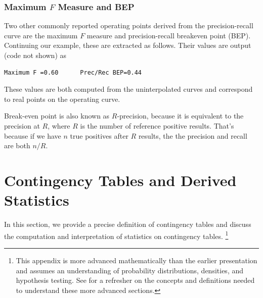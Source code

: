 \subsubsection{Maximum $F$ Measure and BEP}

Two other commonly reported operating points derived from the
precision-recall curve are the maximum $F$ measure and
precision-recall breakeven point (BEP).  Continuing our example,
these are extracted as follows.
%
%
Their values are output (code not shown) as 
\begin{verbatim}
Maximum F =0.60      Prec/Rec BEP=0.44
\end{verbatim}

These values are both computed from the uninterpolated curves and
correspond to real points on the operating curve.

Break-even point is also known as $R$-precision, because it is
equivalent to the precision at $R$, where $R$ is the number of
reference positive results.  That's because if we have $n$ true
positives after $R$ results, the the precision and recall are both
$n/R$.



\section{Contingency Tables and Derived Statistics}\label{section:classifier-eval-contingency-table}

In this section, we provide a precise definition of contingency tables
and discuss the computation and interpretation of statistics on
contingency tables.%
%
\footnote{This appendix is more advanced mathematically than the
  earlier presentation and assumes an understanding of probability
  distributions, densities, and hypothesis testing.  See
   for a refresher on the concepts and definitions
  needed to understand these more advanced sections.}

